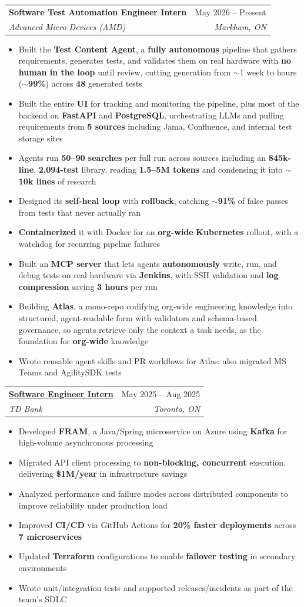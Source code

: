 \documentclass[letterpaper,11pt]{article}
\makeatletter
\newcommand{\resumeItem}[1]{\item\small{{#1 \vspace{-2pt}}}}
\newcommand{\resumeSubheading}[4]{
  \vspace{-2pt}\item
  \begin{tabular*}{0.97\textwidth}[t]{l@{\extracolsep{\fill}}r}
    \textbf{#1} & #2 \\
    \textit{\small#3} & \textit{\small#4} \\
  \end{tabular*}\vspace{-7pt}
}
\newcommand{\resumeItemListStart}{\begin{itemize}}
\newcommand{\resumeItemListEnd}{\end{itemize}\vspace{-5pt}}
\makeatother
\begin{document}
  \resumeSubheading
    {Software Test Automation Engineer Intern}{May 2026 -- Present}
    {Advanced Micro Devices (AMD)}{Markham, ON}
  \resumeItemListStart
    \resumeItem{Built the \textbf{Test Content Agent}, a \textbf{fully autonomous} pipeline that gathers requirements, generates tests, and validates them on real hardware with \textbf{no human in the loop} until review, cutting generation from ${\sim}$1 week to hours (\textbf{${\sim}$99\%}) across \textbf{48} generated tests}
    \resumeItem{Built the entire \textbf{UI} for tracking and monitoring the pipeline, plus most of the backend on \textbf{FastAPI} and \textbf{PostgreSQL}, orchestrating LLMs and pulling requirements from \textbf{5 sources} including Jama, Confluence, and internal test storage sites}
    \resumeItem{Agents run \textbf{50--90 searches} per full run across sources including an \textbf{845k-line}, \textbf{2,094-test} library, reading \textbf{1.5--5M tokens} and condensing it into ${\sim}$\textbf{10k lines} of research}
    \resumeItem{Designed its \textbf{self-heal loop} with \textbf{rollback}, catching \textbf{${\sim}$91\%} of false passes from tests that never actually ran}
    \resumeItem{\textbf{Containerized} it with Docker for an \textbf{org-wide} \textbf{Kubernetes} rollout, with a watchdog for recurring pipeline failures}
    \resumeItem{Built an \textbf{MCP server} that lets agents \textbf{autonomously} write, run, and debug tests on real hardware via \textbf{Jenkins}, with SSH validation and \textbf{log compression} saving \textbf{3 hours} per run}
    \resumeItem{Building \textbf{Atlas}, a mono-repo codifying org-wide engineering knowledge into structured, agent-readable form with validators and schema-based governance, so agents retrieve only the context a task needs, as the foundation for \textbf{org-wide} knowledge}
    \resumeItem{Wrote reusable agent skills and PR workflows for Atlas; also migrated MS Teams and AgilitySDK tests}
  \resumeItemListEnd

  \resumeSubheading
    {\href{https://www.linkedin.com/posts/mahad-hassan_as-my-software-engineering-internship-with-activity-7363738067230195712-W4o_/}{Software Engineer Intern \faLink}}{May 2025 -- Aug 2025}
    {TD Bank}{Toronto, ON}
  \resumeItemListStart
    \resumeItem{Developed \textbf{FRAM}, a Java/Spring microservice on Azure using \textbf{Kafka} for high-volume asynchronous processing}
    \resumeItem{Migrated API client processing to \textbf{non-blocking, concurrent} execution, delivering \textbf{\$1M/year} in infrastructure savings}
    \resumeItem{Analyzed performance and failure modes across distributed components to improve reliability under production load}
    \resumeItem{Improved \textbf{CI/CD} via GitHub Actions for \textbf{20\% faster deployments} across \textbf{7 microservices}}
    \resumeItem{Updated \textbf{Terraform} configurations to enable \textbf{failover testing} in secondary environments}
    \resumeItem{Wrote unit/integration tests and supported releases/incidents as part of the team’s SDLC}
  \resumeItemListEnd
\end{document}
